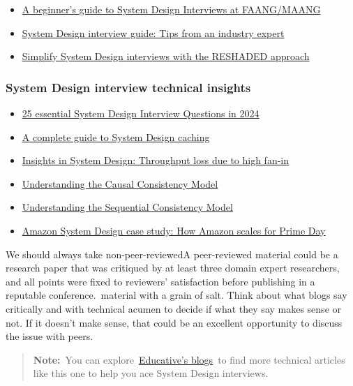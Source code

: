 \begin{itemize}
\item
{}\label{jn-BA-j6sT4X-8k1q9C4W}
\href{https://www.educative.io/blog/faang-system-design-interview-guide}{A beginner's guide to System Design Interviews at FAANG/MAANG}
\item
{}\label{jQZbauZ1NJ5njnFtYpqxf}
\href{https://www.educative.io/blog/system-design-interview-expert-tips}{System Design interview guide: Tips from an industry expert}
\item
{}\label{LRuuB1_medp_4cpJ_y698}
\href{https://www.educative.io/blog/use-reshaded-for-system-design-interviews}{Simplify System Design interviews with the RESHADED approach}
\end{itemize}

\subsubsection{System Design interview technical insights}\label{CBnAOeV_MLYXgoifMvrKW}

\begin{itemize}
\item
{}\label{5H4-hsVGCjTXZstJgj5ns}
\href{https://www.educative.io/blog/system-design-interview-questions}{25 essential System Design Interview Questions in 2024}
\item
{}\label{K4DTFO3Wrs7eeMbNtjJMT}
\href{https://educative.io/blog/system-design-caching}{A complete guide to System Design caching}
\item
{}\label{zIwKoYmM7SxaS1otbziUf}
\href{https://www.educative.io/blog/throughput-loss-high-fan-in}{Insights in System Design: Throughput loss due to high fan-in}
\item
{}\label{tqg1F9A_4XlAUU4e8gv1S}
\href{https://www.educative.io/blog/causal-consistency-model}{Understanding the Causal Consistency Model}
\item
{}\label{sDEONK3mrloUuy3MJ8h8b}
\href{https://www.educative.io/blog/understanding-sequential-consistency-model}{Understanding the Sequential Consistency Model}
\item
{}\label{wS8YtnRhmIVzL0-6e1rr6}
\href{https://www.educative.io/blog/amazon-system-design-prime-day}{Amazon System Design case study: How Amazon scales for Prime Day}
\end{itemize}

We should always take non-peer-reviewedA peer-reviewed material could be a research paper that was critiqued by at least three domain expert researchers, and all points were fixed to reviewers' satisfaction before publishing in a reputable conference.~material with a grain of salt. Think about what blogs say critically and with technical acumen to decide if what they say makes sense or not. If it doesn't make sense, that could be an excellent opportunity to discuss the issue with peers.
\begin{quote}
\textbf{Note:}~You can explore~\href{https://www.educative.io/blog/category/system-design}{Educative's blogs}~to find more technical articles like this one to help you ace System Design interviews.
\end{quote}
